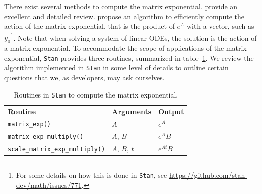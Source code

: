 \documentclass[11pt]{article}
\begin{document}
There exist several methods to compute the matrix exponential.
\cite{MolerAndVanLoan:2003} provide an excellent and detailed review.
\cite{Al-Mohy:2011} propose an algorithm to efficiently compute the action of the matrix exponential,
that is the product of $e^A$ with a vector, such as $y_0$\footnote{For some details on how this is
done in \texttt{Stan}, see \url{https://github.com/stan-dev/math/issues/771}.}.
Note that when solving a system of linear ODEs, the solution is the action of a matrix exponential.
To accommodate the scope of applications of the matrix exponential, \texttt{Stan} provides three routines,
summarized in table~\ref{tab:matrixExp}.
%
We review the algorithm implemented in \texttt{Stan} in some level of details
to outline certain questions that we, as developers, may ask ourselves.

\setlength{\extrarowheight}{10pt}
\begin{table}
  \begin{center}
  \begin{tabular}{l l l}
  \rowcolor[gray]{0.95} \textbf{Routine} & \textbf{Arguments} & \textbf{Output} \\
  \texttt{matrix\_exp()} & $A$ & $e^A$ \\
  \rowcolor[gray]{0.95} \texttt{matrix\_exp\_multiply()} & $A$, $B$ & $e^A B$ \\
  \texttt{scale\_matrix\_exp\_multiply()} & $A$, $B$, $t$ & $e^{At} B$ \\
  \end{tabular}
  \caption{Routines in \texttt{Stan} to compute the matrix exponential.}
  \label{MatrixExp}
  \end{center}
  \label{tab:matrixExp}
\end{table}
\setlength{\extrarowheight}{0pt}
\end{document}
